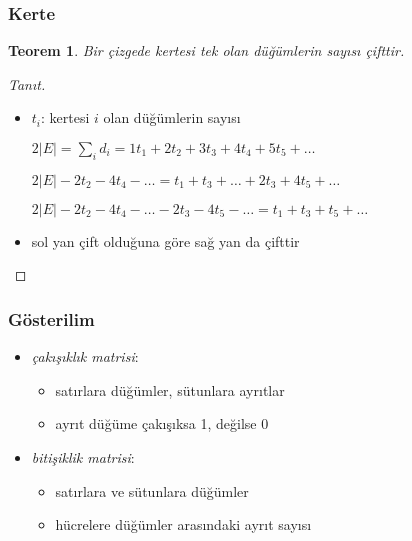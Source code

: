 \documentclass[dvipsnames]{beamer}
\theoremstyle{definition}
\theoremstyle{example}
\theoremstyle{plain}
\newtheorem{teorem}[theorem]{Teorem}
\begin{document}
\begin{frame}
  \frametitle{Kerte}

  \begin{teorem}
    Bir çizgede kertesi tek olan düğümlerin sayısı çifttir.
  \end{teorem}

  \pause
  \begin{proof}[Tanıt]
    \begin{itemize}
      \item $t_i$: kertesi $i$ olan düğümlerin sayısı

      \pause
$2|E| = \sum_i d_i = 1t_1 + 2t_2 + 3t_3 + 4t_4 + 5t_5 + \dots$

\pause
$2|E| - 2t_2 - 4t_4 - \dots = t_1 + t_3 + \dots + 2t_3 + 4t_5 + \dots$

\pause
$2|E| - 2t_2 - 4t_4 - \dots - 2t_3 - 4t_5 - \dots = t_1 + t_3 + t_5 + \dots$

      \pause
      \item sol yan çift olduğuna göre sağ yan da çifttir
    \end{itemize}
  \end{proof}
\end{frame}

\begin{frame}
  \frametitle{Gösterilim}

  \begin{itemize}
    \item \emph{çakışıklık matrisi}:
    \begin{itemize}
      \item satırlara düğümler, sütunlara ayrıtlar
      \item ayrıt düğüme çakışıksa 1, değilse 0
    \end{itemize}

    \pause
    \medskip
    \item \emph{bitişiklik matrisi}:
    \begin{itemize}
      \item satırlara ve sütunlara düğümler
      \item hücrelere düğümler arasındaki ayrıt sayısı
    \end{itemize}
  \end{itemize}
\end{frame}
\end{document}
